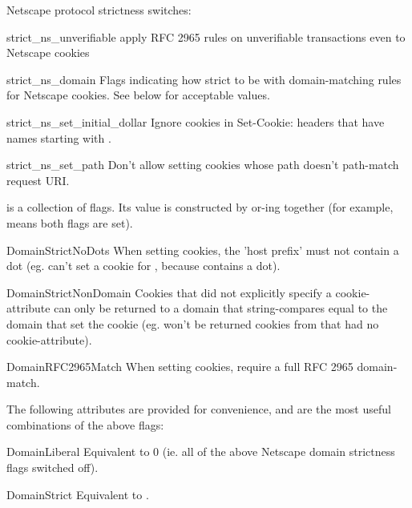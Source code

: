 Netscape protocol strictness switches:

\begin{memberdesc}{strict_ns_unverifiable}
apply RFC 2965 rules on unverifiable transactions even to Netscape
cookies
\end{memberdesc}
\begin{memberdesc}{strict_ns_domain}
Flags indicating how strict to be with domain-matching rules for
Netscape cookies.  See below for acceptable values.
\end{memberdesc}
\begin{memberdesc}{strict_ns_set_initial_dollar}
Ignore cookies in Set-Cookie: headers that have names starting with
.
\end{memberdesc}
\begin{memberdesc}{strict_ns_set_path}
Don't allow setting cookies whose path doesn't path-match request URI.
\end{memberdesc}

 is a collection of flags.  Its value is
constructed by or-ing together (for example,
 means both flags are
set).

\begin{memberdesc}{DomainStrictNoDots}
When setting cookies, the 'host prefix' must not contain a dot
(eg.  can't set a cookie for ,
because  contains a dot).
\end{memberdesc}
\begin{memberdesc}{DomainStrictNonDomain}
Cookies that did not explicitly specify a 
cookie-attribute can only be returned to a domain that string-compares
equal to the domain that set the cookie (eg. 
won't be returned cookies from  that had no
 cookie-attribute).
\end{memberdesc}
\begin{memberdesc}{DomainRFC2965Match}
When setting cookies, require a full RFC 2965 domain-match.
\end{memberdesc}

The following attributes are provided for convenience, and are the
most useful combinations of the above flags:

\begin{memberdesc}{DomainLiberal}
Equivalent to 0 (ie. all of the above Netscape domain strictness flags
switched off).
\end{memberdesc}
\begin{memberdesc}{DomainStrict}
Equivalent to .
\end{memberdesc}



